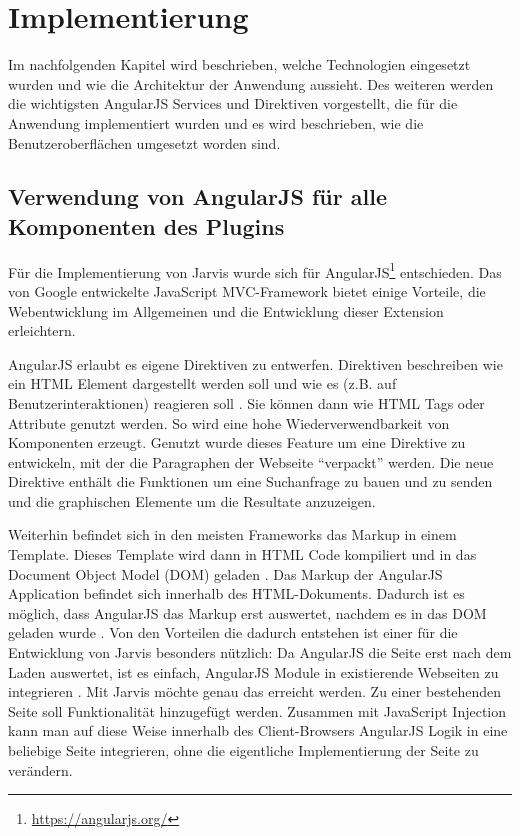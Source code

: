 \section{Implementierung}
Im nachfolgenden Kapitel wird beschrieben, welche Technologien eingesetzt wurden und wie die Architektur der Anwendung aussieht. Des weiteren werden die wichtigsten AngularJS Services und Direktiven vorgestellt, die für die Anwendung implementiert wurden und es wird beschrieben, wie die Benutzeroberflächen umgesetzt worden sind.

 \subsection{Verwendung von AngularJS für alle Komponenten des Plugins}
 Für die Implementierung von Jarvis wurde sich für AngularJS\footnote{\url{https://angularjs.org/}} entschieden. Das von Google entwickelte JavaScript MVC-Framework bietet einige Vorteile, die Webentwicklung im Allgemeinen und die Entwicklung dieser Extension erleichtern.

 AngularJS erlaubt es eigene Direktiven zu entwerfen. Direktiven beschreiben wie ein HTML Element dargestellt werden soll und wie es (z.B. auf Benutzerinteraktionen) reagieren soll \cite{jain2015angularjs}. Sie können dann wie HTML Tags oder Attribute genutzt werden. So wird eine hohe Wiederverwendbarkeit von Komponenten erzeugt. Genutzt wurde dieses Feature um eine Direktive zu entwickeln, mit der die Paragraphen der Webseite ``verpackt'' werden. Die neue Direktive enthält die Funktionen um eine Suchanfrage zu bauen und zu senden und die graphischen Elemente um die Resultate anzuzeigen. 

 Weiterhin befindet sich in den meisten Frameworks das Markup in einem Template. Dieses Template wird dann in HTML Code kompiliert und in das Document Object Model (DOM) geladen \cite{jain2015angularjs}. Das Markup der AngularJS Application befindet sich innerhalb des HTML-Dokuments. Dadurch ist es möglich, dass AngularJS das Markup erst auswertet, nachdem es in das DOM geladen wurde \cite{jain2015angularjs}. Von den Vorteilen die dadurch entstehen ist einer für die Entwicklung von Jarvis besonders nützlich: Da AngularJS die Seite erst nach dem Laden auswertet, ist es einfach, AngularJS Module in existierende Webseiten zu integrieren \cite{jain2015angularjs}. Mit Jarvis möchte genau das erreicht werden. Zu einer bestehenden Seite soll Funktionalität hinzugefügt werden. Zusammen mit JavaScript Injection kann man auf diese Weise innerhalb des Client-Browsers AngularJS Logik in eine beliebige Seite integrieren, ohne die eigentliche Implementierung der Seite zu verändern.

